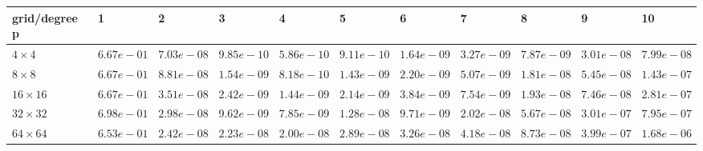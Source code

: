\begin{tabular}{lllllllllll}
\hline
 grid/degree p   & 1          & 2          & 3          & 4          & 5          & 6          & 7          & 8          & 9          & 10         \\
\hline
 $4 \times 4$    & $6.67e-01$ & $7.03e-08$ & $9.85e-10$ & $5.86e-10$ & $9.11e-10$ & $1.64e-09$ & $3.27e-09$ & $7.87e-09$ & $3.01e-08$ & $7.99e-08$ \\
 $8 \times 8$    & $6.67e-01$ & $8.81e-08$ & $1.54e-09$ & $8.18e-10$ & $1.43e-09$ & $2.20e-09$ & $5.07e-09$ & $1.81e-08$ & $5.45e-08$ & $1.43e-07$ \\
 $16 \times 16$  & $6.67e-01$ & $3.51e-08$ & $2.42e-09$ & $1.44e-09$ & $2.14e-09$ & $3.84e-09$ & $7.54e-09$ & $1.93e-08$ & $7.46e-08$ & $2.81e-07$ \\
 $32 \times 32$  & $6.98e-01$ & $2.98e-08$ & $9.62e-09$ & $7.85e-09$ & $1.28e-08$ & $9.71e-09$ & $2.02e-08$ & $5.67e-08$ & $3.01e-07$ & $7.95e-07$ \\
 $64 \times 64$  & $6.53e-01$ & $2.42e-08$ & $2.23e-08$ & $2.00e-08$ & $2.89e-08$ & $3.26e-08$ & $4.18e-08$ & $8.73e-08$ & $3.99e-07$ & $1.68e-06$ \\
\hline
\end{tabular}